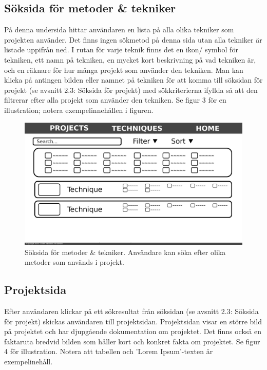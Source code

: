 \documentclass{liu_mall}
\begin{document}
\newpage
\subsection{Söksida för metoder \& tekniker}
    På denna undersida hittar användaren en lista på alla olika tekniker som projekten använder. Det finns ingen sökmetod på denna sida utan alla tekniker är listade uppifrån ned. I rutan för varje teknik finns det en ikon/ symbol för tekniken, ett namn på tekniken, en mycket kort beskrivning på vad tekniken är, och en räknare för hur många projekt som använder den tekniken. Man kan klicka på antingen bilden eller namnet på tekniken för att komma till söksidan för projekt (se avsnitt 2.3: Söksida för projekt) med sökkriterierna ifyllda så att den filtrerar efter alla projekt som använder den tekniken. Se figur 3 för en illustration; notera exempelinnehållen i figuren.

    \begin{figure}[h!]
        \centering
        \includegraphics{LOFI Techniques}
        \caption{Söksida för metoder \& tekniker. Användare kan söka efter olika metoder som används i projekt.}
        \label{fig:Low-Fidelity-Prototyp Techniques}
    \end{figure}

\newpage
\subsection{Projektsida}
    Efter användaren klickar på ett sökresultat från söksidan (se avsnitt 2.3: Söksida för projekt) skickas användaren till projektsidan. Projektsidan visar en större bild på projektet och har djupgående dokumentation om projektet. Det finns också en faktaruta bredvid bilden som håller kort och konkret fakta om projektet. Se figur 4 för illustration. Notera att tabellen och 'Lorem Ipsum'-texten är exempelinehåll.
\end{document}
